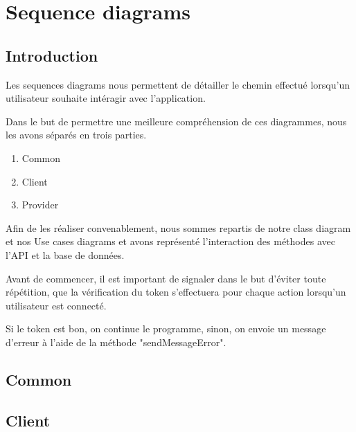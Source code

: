 \section{Sequence diagrams}

\subsection{Introduction}

\begin{flushleft}
Les sequences diagrams nous permettent de détailler le chemin effectué lorsqu'un utilisateur souhaite intéragir avec l'application.
\end{flushleft}

\begin{flushleft}
Dans le but de permettre une meilleure compréhension de ces diagrammes, nous les avons séparés en trois parties.
\begin{enumerate}
\item Common
\item Client
\item Provider
\end{enumerate}
\end{flushleft}

\begin{flushleft}
Afin de les réaliser convenablement, nous sommes repartis de notre class diagram et nos Use cases diagrams et avons représenté l'interaction des méthodes avec l'API et la base de données.
\end{flushleft}

\begin{flushleft}
Avant de commencer, il est important de signaler dans le but d'éviter toute répétition, que la vérification du token s'effectuera pour chaque action lorsqu'un utilisateur est connecté.
\end{flushleft}

\begin{flushleft}
Si le token est bon, on continue le programme, sinon, on envoie un message d'erreur à l'aide de la méthode "sendMessageError".
\end{flushleft}

\newpage
\subsection{Common}

\newpage
\subsection{Client}

